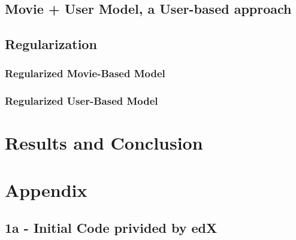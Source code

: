 \documentclass[]{article}
\begin{document}
\hypertarget{movie-user-model-a-user-based-approach}{%
\subsection{Movie + User Model, a User-based
approach}\label{movie-user-model-a-user-based-approach}}

\hypertarget{regularization}{%
\subsection{Regularization}\label{regularization}}

\hypertarget{regularized-movie-based-model}{%
\subsubsection{Regularized Movie-Based
Model}\label{regularized-movie-based-model}}

\hypertarget{regularized-user-based-model}{%
\subsubsection{Regularized User-Based
Model}\label{regularized-user-based-model}}

\hypertarget{results-and-conclusion}{%
\section{Results and Conclusion}\label{results-and-conclusion}}

\hypertarget{appendix}{%
\section{Appendix}\label{appendix}}

\hypertarget{a---initial-code-privided-by-edx}{%
\subsection{1a - Initial Code privided by
edX}\label{a---initial-code-privided-by-edx}}
\end{document}
